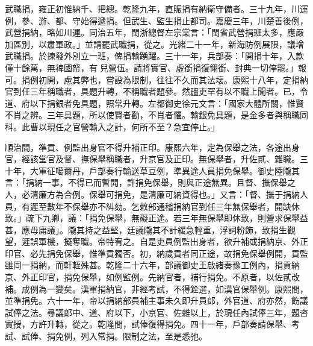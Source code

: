 \begin{pinyinscope}
武職捐，雍正初惟納千、把總。乾隆九年，直賑捐有納衛守備者。三十九年，川運例，參、游、都、守始得遞捐。但武生、監生捐止都司。嘉慶三年，川楚善後例，武營捐納，略如川運。同治五年，閩浙總督左宗棠言：「閩省武營捐班太多，應嚴加區別，以肅軍政。」並請罷武職捐，從之。光緒二十一年，新海防例展限，議增武職捐。於揀發外別立一班，俾捐輸踴躍。三十一年，兵部奏：「開捐十年，入款僅十餘萬，無裨國帑，有兒營伍。請將實官、虛銜捐復翎銜、封典一切停罷。」報可。捐例初開，慮其弊也，嘗設為限制，往往不久而其法壞。康熙十八年，定捐納官到任三年稱職者，具題升轉，不稱職者題參。然疆吏罕有以不職上聞者。已，令道、府以下捐銀者免具題，照常升轉。左都御史徐元文言：「國家大體所關，惟賢不肖之辨。三年具題，所以使賢者勸，不肖者懼。輸銀免具題，是金多者與稱職同科。此曹以現任之官營輸入之計，何所不至？急宜停止。」

順治間，準貢、例監出身官不得升補正印。康熙六年，定為保舉之法，各途出身官，經該堂官及督、撫保舉稱職者，升京官及正印。無保舉者，升佐貳、雜職。三十年，大軍征噶爾丹，戶部奏行輸送草豆例，準異途人員捐免保舉。御史陸隴其言：「捐納一事，不得已而暫開，許捐免保舉，則與正途無異。且督、撫保舉之人，必清廉方為合例。保舉可捐免，是清廉可納資得也。」又言：「督、撫于捐納人員，有遲至數年不保舉亦不糾劾。乞敕部通稽捐納官到任三年無保舉者，開缺休致。」疏下九卿，議：「捐免保舉，無礙正途。若三年無保舉即休致，則營求保舉益甚，應毋庸議」。隴其持之益堅，廷議隴其不計緩急輕重，浮詞粉飾，致捐生觀望，遲誤軍機，擬奪職。帝特宥之。自是吏員例監出身者，欲升補或捐納京、外正印官、必先捐免保舉，惟準貢獨否。初，納歲貢者同正途，故捐免保舉例開，貢監雖同一捐納，而軒輊殊甚。乾隆二十六年，部議御史王啟緒奏豫工例內，捐貢納京、外正印官，捐免保舉，如例監例。先納官者，補行捐免。不原者，以佐貳改補。成例為一變矣。漢軍捐納官，非經考試，不得銓選，如漢官保舉例。康熙間，並準捐免。六十一年，帝以捐納部員補主事未久即升員郎，外官道、府亦然，飭議試俸之法。尋議郎中、道、府以下，小京官、佐雜以上，於現任內試俸三年，題咨實授，方許升轉，從之。乾隆間，試俸復得捐免。四十一年，戶部奏請保舉、考試、試俸、捐免例，列入常捐。限制之法，至是悉弛。


\end{pinyinscope}
